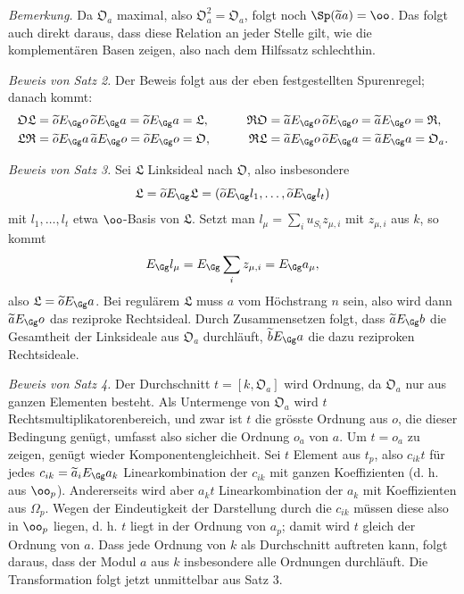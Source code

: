 \emph{Bemerkung.} Da $\mathfrak O_a$ maximal, also $\mathfrak O_a^2=\mathfrak O_a$, folgt noch $\Sp(\widetilde a a)=\oo$. Das folgt auch direkt daraus, dass diese Relation an jeder Stelle gilt, wie die komplementären Basen zeigen, also nach dem Hilfssatz schlechthin.

\medskip
\noindent\emph{Beweis von Satz 2.} Der Beweis folgt aus der eben festgestellten Spurenregel; danach kommt:
\[
\begin{aligned}
\mathfrak O\mathfrak L
 &=\widetilde oE_\Gg o\,\widetilde oE_\Gg a
 =\widetilde oE_\Gg a=\mathfrak L,
&\qquad
\mathfrak R\mathfrak O
 &=\widetilde aE_\Gg o\,\widetilde oE_\Gg o
 =\widetilde aE_\Gg o=\mathfrak R,\\
\mathfrak L\mathfrak R
 &=\widetilde oE_\Gg a\,\widetilde aE_\Gg o
 =\widetilde oE_\Gg o=\mathfrak O,
&
\mathfrak R\mathfrak L
 &=\widetilde aE_\Gg o\,\widetilde oE_\Gg a
 =\widetilde aE_\Gg a=\mathfrak O_a.
\end{aligned}
\]

\medskip
\noindent\emph{Beweis von Satz 3.} Sei $\mathfrak L$ Linksideal nach $\mathfrak O$, also insbesondere
\[
\mathfrak L=\widetilde oE_\Gg\mathfrak L
 =(\widetilde oE_\Gg l_1,\ldots,\widetilde oE_\Gg l_t)
\]
mit $l_1,\ldots,l_t$ etwa $\oo$-Basis von $\mathfrak L$. Setzt man $l_\mu=\sum_i u_{S_i}z_{\mu,i}$ mit $z_{\mu,i}$ aus $k$, so kommt
\[
E_\Gg l_\mu=E_\Gg\sum_i z_{\mu,i}=E_\Gg a_\mu,
\]
also $\mathfrak L=\widetilde oE_\Gg a$. Bei regulärem $\mathfrak L$ muss $a$ vom Höchstrang $n$ sein, also wird dann $\widetilde aE_\Gg o$ das reziproke Rechtsideal. Durch Zusammensetzen folgt, dass $\widetilde aE_\Gg b$ die Gesamtheit der Linksideale aus $\mathfrak O_a$ durchläuft, $\widetilde bE_\Gg a$ die dazu reziproken Rechtsideale.

\medskip
\noindent\emph{Beweis von Satz 4.} Der Durchschnitt $t=[k,\mathfrak O_a]$ wird Ordnung, da $\mathfrak O_a$ nur aus ganzen Elementen besteht. Als Untermenge von $\mathfrak O_a$ wird $t$ Rechtsmultiplikatorenbereich, und zwar ist $t$ die grösste Ordnung aus $o$, die dieser Bedingung genügt, umfasst also sicher die Ordnung $o_a$ von $a$. Um $t=o_a$ zu zeigen, genügt wieder Komponentengleichheit. Sei $t$ Element aus $t_p$, also $c_{ik}t$ für jedes $c_{ik}=\widetilde a_iE_\Gg a_k$ Linearkombination der $c_{ik}$ mit ganzen Koeffizienten (d. h. aus $\oo_p$). Andererseits wird aber $a_kt$ Linearkombination der $a_k$ mit Koeffizienten aus $\Omega_p$. Wegen der Eindeutigkeit der Darstellung durch die $c_{ik}$ müssen diese also in $\oo_p$ liegen, d. h. $t$ liegt in der Ordnung von $a_p$; damit wird $t$ gleich der Ordnung von $a$. Dass jede Ordnung von $k$ als Durchschnitt auftreten kann, folgt daraus, dass der Modul $a$ aus $k$ insbesondere alle Ordnungen durchläuft. Die Transformation folgt jetzt unmittelbar aus Satz 3.

